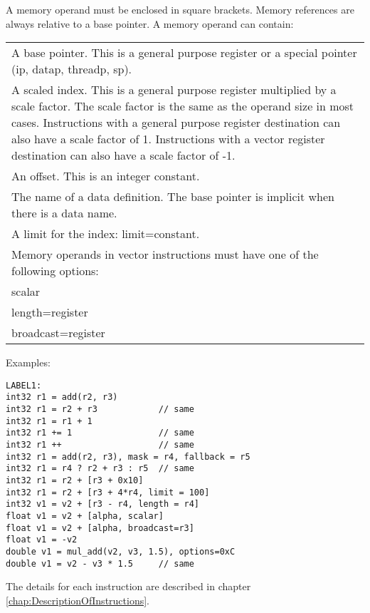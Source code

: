 \documentclass[forwardcom.tex]{subfiles}
\begin{document}
A memory operand must be enclosed in square brackets. Memory references are always relative to a base pointer. A memory operand can contain:
\vspace{2mm}

\begin{tabular}{|p{150mm}|}
\hline
A base pointer. This is a general purpose register or a special pointer (ip, datap, threadp, sp).\\
A scaled index. This is a general purpose register multiplied by a scale factor. The scale factor is the same as the operand size in most cases. Instructions with a general purpose register destination can also have a scale factor of 1. Instructions with a vector register destination can also have a scale factor of -1. \\
An offset. This is an integer constant.\\
The name of a data definition. The base pointer is implicit when there is a data name.\\
A limit for the index: limit=constant.\\
Memory operands in vector instructions must have one of the following options:\\
scalar\\
length=register\\
broadcast=register\\
\hline
\end{tabular}

\vspace{4mm}

Examples:
\vspace{2mm}

\begin{lstlisting}[frame=single]
LABEL1:
int32 r1 = add(r2, r3)
int32 r1 = r2 + r3            // same
int32 r1 = r1 + 1
int32 r1 += 1                 // same
int32 r1 ++                   // same
int32 r1 = add(r2, r3), mask = r4, fallback = r5
int32 r1 = r4 ? r2 + r3 : r5  // same
int32 r1 = r2 + [r3 + 0x10]
int32 r1 = r2 + [r3 + 4*r4, limit = 100]
int32 v1 = v2 + [r3 - r4, length = r4]
float v1 = v2 + [alpha, scalar]
float v1 = v2 + [alpha, broadcast=r3]
float v1 = -v2
double v1 = mul_add(v2, v3, 1.5), options=0xC
double v1 = v2 - v3 * 1.5     // same
\end{lstlisting}
\vspace{2mm}

The details for each instruction are described in chapter \ref{chap:DescriptionOfInstructions}.
\vspace{2mm}
\end{document}
